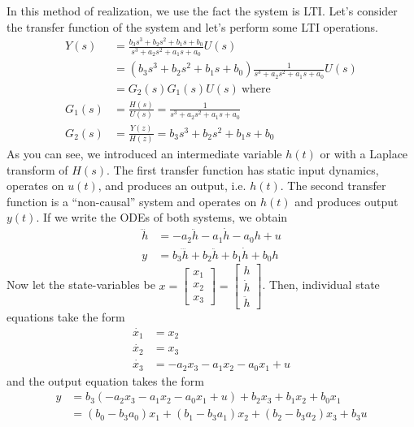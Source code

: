 \documentclass[twoside]{article}
\begin{document}
In this method of realization, we use the fact the system is
LTI. Let's consider the transfer function of the system and let's 
perform some LTI operations.
%
\begin{align*}
Y(s) &= \frac{ b_3 s^3 + b_2 s^2  + b_1 s + b_0 }{ s^3 + a_2 s^2 + a_1 s + a_0} U(s)
\\
&= \left( b_3 s^3 + b_2 s^2  + b_1 s + b_0 \right)  
\frac{1}{ s^3 + a_2 s^2 + a_1 s + a_0 } U(s) 
\\
&= G_2(s) G_1(s) U(s) \ \mathrm{where} 
\\
G_1(s) &= \frac{H(s)}{U(s)} = \frac{1}{ s^3 + a_2 s^2 + a_1 s + a_0 } 
\\
G_2(s) &= \frac{Y(z)}{H(z)} = b_3 s^3 + b_2 s^2  + b_1 s + b_0
\end{align*}
%
As you can see, we introduced an intermediate variable $h(t)$ or with a
Laplace transform of $H(s)$. The first transfer function has static input
dynamics, operates on $u(t)$, and produces an output, i.e. $h(t)$. 
The second transfer function is a ``non-causal'' system and operates on $h(t)$ and produces output
$y(t)$. If we write the ODEs of both systems, we obtain
%
\begin{align*}
\dddot{h} &= -a_2 \ddot{h} - a_1 \dot{h} - a_0 h + u
\\
y &= b_3 \dddot{h} + b_2 \ddot{h} + b_1 \dot{h} + b_0 h
\end{align*}
%
Now let the state-variables be 
$x = \left[ \begin{array}{c} x_1 \\ x_2 \\ x_3 \end{array} \right] 
= \left[ \begin{array}{c} h \\ \dot{h} \\ \ddot{h} \end{array} \right]$. Then,
individual state equations take the form
%
\begin{align*}
\dot{x_1} &= x_2
\\
\dot{x_2} &= x_3
\\
\dot{x_3} &= -a_2 x_3 - a_1 x_2 - a_0 x_1 + u
\end{align*}
%
and the output equation takes the form
%
\begin{align*}
y &= b_3\left( -a_2 x_3 - a_1 x_2 - a_0 x_1 + u \right) + b_2 x_3 +
    b_1 x_2 + b_0 x_1
\\
&= ( b_0 - b_3 a_0 ) x_1 + ( b_1 - b_3 a_1 ) x_2 + ( b_2 - b_3 a_2 ) x_3 + b_3 u
\end{align*}
\end{document}
